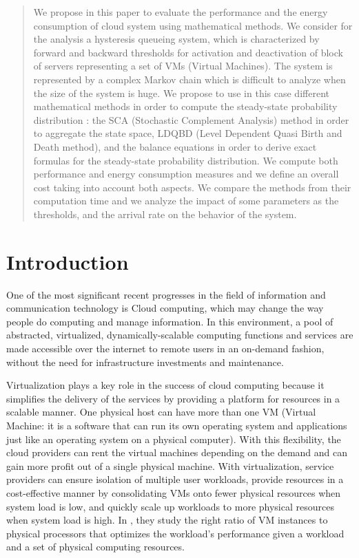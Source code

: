 \documentclass[conference]{IEEEtran}
\begin{document}
\begin{abstract}
We propose in this paper to evaluate the performance and the energy consumption of cloud system using mathematical methods. We consider for the analysis a hysteresis 
queueing system, which is characterized by  forward and backward thresholds for activation and deactivation of block of  servers representing a set of VMs (Virtual Machines).  
The system is represented by a complex 
Markov chain which  is difficult to analyze when the size of the system is huge. We propose to use in this case different mathematical methods in 
order to compute the steady-state probability distribution : the SCA (Stochastic Complement Analysis) method in order to aggregate 
the state space,   LDQBD (Level Dependent Quasi Birth and Death method), and    the balance equations in order to derive exact formulas for the steady-state probability distribution.
We compute both performance and energy consumption measures and we define an overall cost taking into account both aspects. 
We compare the methods from their computation time and we analyze the impact of some parameters  as the thresholds, and the arrival rate on the behavior of the system. 

\end{abstract}


\section{Introduction}

One of the most significant recent progresses in the field of information and communication technology is Cloud computing, which may
change the way people do computing and manage information. In this environment, a pool of abstracted, virtualized, dynamically-scalable
computing functions and services   are made accessible over the internet to remote users in an on-demand fashion, without the need for  
infrastructure investments and maintenance.

Virtualization plays a key role in the success of cloud computing because it simplifies the delivery of the services by providing a platform for 
resources in a scalable manner.   One physical host can have  more than one VM (Virtual Machine: it is a software that can run its own operating system
and applications just like an operating system on a physical computer). With this flexibility, the cloud providers can rent the virtual machines 
depending on the demand and  can gain more profit out of a single physical machine. With virtualization, service providers can ensure isolation of 
multiple user workloads, provide resources in a cost-effective manner by consolidating VMs onto fewer physical resources when system load is low, 
and quickly scale up workloads to more physical resources when system load is high. In \cite{WHV10}, they study the right ratio of VM instances to 
physical processors that optimizes the workload's performance given a workload and a set of physical computing resources.
\end{document}
